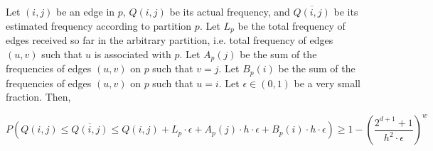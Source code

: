 \begin{theorem}
\label{efreqguarantee}
Let $(i,j)$ be an edge in $p$, $Q(i,j)$ be its actual frequency, and $\overline{Q(i,j)}$ be its estimated frequency according to partition $p$. Let $L_p$ be the total frequency of edges received so far in the arbitrary partition, i.e. total frequency of edges $(u,v)$ such that $u$ is associated with $p$. Let $A_p(j)$ be the sum of the frequencies of edges $(u,v)$ on $p$ such that $v=j$. Let $B_p(i)$ be the sum of the frequencies of edges $(u,v)$ on $p$ such that $u=i$. Let $\epsilon \in (0,1)$ be a very small fraction. Then,
  
  \[
P(Q(i,j) \leq \overline{Q(i,j)} \leq Q(i,j) + L_p \cdot \epsilon + A_p(j) \cdot h \cdot \epsilon + B_p(i) \cdot h \cdot \epsilon) \geq 1-(\frac{2^{d+1}+1}{h^2\cdot\epsilon})^w
\]

\end{theorem}

